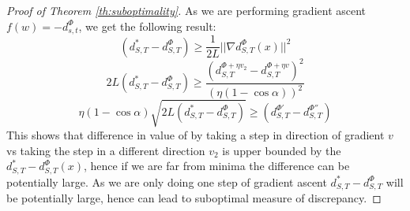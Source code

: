\documentclass[table,dvipsnames]{article}
\theoremstyle{plain}
\theoremstyle{definition}
\theoremstyle{remark}
\begin{document}
\begin{proof}[Proof of Theorem \ref{th:suboptimality}]
As we are performing gradient ascent $f(w) = -d^{\Phi}_{s,t}$, we get the following result:
$$
 (d^{*}_{S,T} - d^{\Phi}_{S,T}) \geq   \frac{1}{2L}|| \nabla d^{\Phi}_{S,T}(x) ||^2
$$
$$
2L (d^{*}_{S,T} - d^{\Phi}_{S,T} ) \geq \frac{(d^{\Phi + \eta v_2}_{S,T} - d^{\Phi + \eta v}_{S,T})^2}{(\eta(1 - \cos \alpha))^2}
$$
$$
\eta(1 - \cos \alpha)\sqrt{2L(d^*_{S,T} - d^{\Phi}_{S,T}) } \geq {(d^{\Phi'}_{S,T} - d^{\Phi''}_{S,T})}
$$
This shows that difference in value of by taking a step in direction of gradient $v$ vs taking the step in a different direction $v_2$ is upper bounded by the $ d^{*}_{S,T} - d^{\Phi}_{S,T}(x)$, hence if we are far from minima the difference can be potentially large. As we are only doing one step of gradient ascent $ d^{*}_{S,T} - d^{\Phi}_{S,T}$ will be potentially large, hence can lead to suboptimal measure of discrepancy. 
\end{proof}
\end{document}
